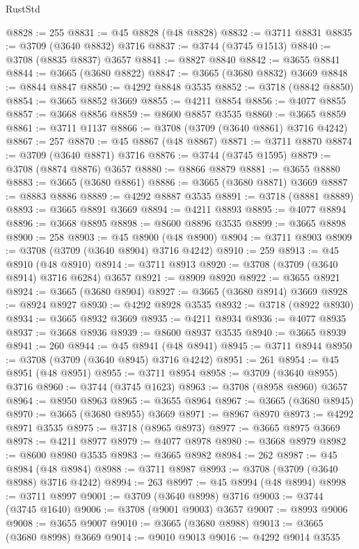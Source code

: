 \begin{lexlean}{RustStd}
\begin{coremodule}
@8828 := 255
@8831 := @45 @8828 (@48 @8828)
@8832 := @3711 @8831
@8835 := @3709 (@3640 @8832) @3716
@8837 := @3744 (@3745 @1513)
@8840 := @3708 (@8835 @8837) @3657
@8841 := @8827 @8840
@8842 := @3655 @8841
@8844 := @3665 (@3680 @8822)
@8847 := @3665 (@3680 @8832) @3669
@8848 := @8844 @8847
@8850 := @4292 @8848 @3535
@8852 := @3718 (@8842 @8850)
@8854 := @3665 @8852 @3669
@8855 := @4211 @8854
@8856 := @4077 @8855
@8857 := @3668 @8856
@8859 := @8600 @8857 @3535
@8860 := @3665 @8859
@8861 := @3711 @1137
@8866 := @3708 (@3709 (@3640 @8861) @3716 @4242)
@8867 := 257
@8870 := @45 @8867 (@48 @8867)
@8871 := @3711 @8870
@8874 := @3709 (@3640 @8871) @3716
@8876 := @3744 (@3745 @1595)
@8879 := @3708 (@8874 @8876) @3657
@8880 := @8866 @8879
@8881 := @3655 @8880
@8883 := @3665 (@3680 @8861)
@8886 := @3665 (@3680 @8871) @3669
@8887 := @8883 @8886
@8889 := @4292 @8887 @3535
@8891 := @3718 (@8881 @8889)
@8893 := @3665 @8891 @3669
@8894 := @4211 @8893
@8895 := @4077 @8894
@8896 := @3668 @8895
@8898 := @8600 @8896 @3535
@8899 := @3665 @8898
@8900 := 258
@8903 := @45 @8900 (@48 @8900)
@8904 := @3711 @8903
@8909 := @3708 (@3709 (@3640 @8904) @3716 @4242)
@8910 := 259
@8913 := @45 @8910 (@48 @8910)
@8914 := @3711 @8913
@8920 := @3708 (@3709 (@3640 @8914) @3716 @6284) @3657
@8921 := @8909 @8920
@8922 := @3655 @8921
@8924 := @3665 (@3680 @8904)
@8927 := @3665 (@3680 @8914) @3669
@8928 := @8924 @8927
@8930 := @4292 @8928 @3535
@8932 := @3718 (@8922 @8930)
@8934 := @3665 @8932 @3669
@8935 := @4211 @8934
@8936 := @4077 @8935
@8937 := @3668 @8936
@8939 := @8600 @8937 @3535
@8940 := @3665 @8939
@8941 := 260
@8944 := @45 @8941 (@48 @8941)
@8945 := @3711 @8944
@8950 := @3708 (@3709 (@3640 @8945) @3716 @4242)
@8951 := 261
@8954 := @45 @8951 (@48 @8951)
@8955 := @3711 @8954
@8958 := @3709 (@3640 @8955) @3716
@8960 := @3744 (@3745 @1623)
@8963 := @3708 (@8958 @8960) @3657
@8964 := @8950 @8963
@8965 := @3655 @8964
@8967 := @3665 (@3680 @8945)
@8970 := @3665 (@3680 @8955) @3669
@8971 := @8967 @8970
@8973 := @4292 @8971 @3535
@8975 := @3718 (@8965 @8973)
@8977 := @3665 @8975 @3669
@8978 := @4211 @8977
@8979 := @4077 @8978
@8980 := @3668 @8979
@8982 := @8600 @8980 @3535
@8983 := @3665 @8982
@8984 := 262
@8987 := @45 @8984 (@48 @8984)
@8988 := @3711 @8987
@8993 := @3708 (@3709 (@3640 @8988) @3716 @4242)
@8994 := 263
@8997 := @45 @8994 (@48 @8994)
@8998 := @3711 @8997
@9001 := @3709 (@3640 @8998) @3716
@9003 := @3744 (@3745 @1640)
@9006 := @3708 (@9001 @9003) @3657
@9007 := @8993 @9006
@9008 := @3655 @9007
@9010 := @3665 (@3680 @8988)
@9013 := @3665 (@3680 @8998) @3669
@9014 := @9010 @9013
@9016 := @4292 @9014 @3535

\end{coremodule}
\end{lexlean}
